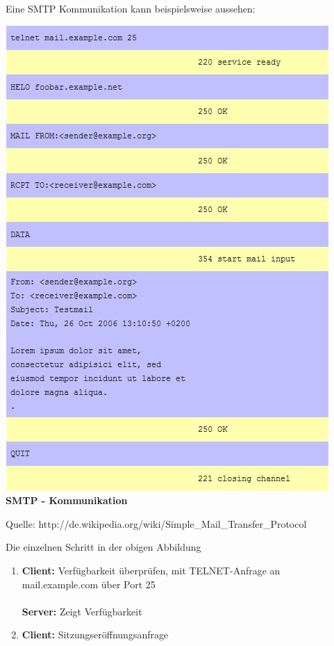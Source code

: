 \documentclass[12pt,a4paper]{report}
\begin{document}
\begin{onehalfspace}
Eine SMTP Kommunikation kann beispielsweise aussehen:
\begin{center}
\includegraphics[scale=0.9]{../docs/lyaton/graphics/SMTP-Kommunikation.png}\\
\textbf{SMTP - Kommunikation}\\
\begin{scriptsize}
Quelle: http://de.wikipedia.org/wiki/Simple\_Mail\_Transfer\_Protocol
\end{scriptsize}
\end{center}
Die einzelnen Schritt in der obigen Abbildung
\begin{enumerate}
\item \textbf{Client:} Verfügbarkeit überprüfen, mit TELNET-Anfrage an mail.example.com über Port 25\\\\
\textbf{Server:} Zeigt Verfügbarkeit
\item \textbf{Client:} Sitzungseröffnungsanfrage\\\\

\end{enumerate}
\end{onehalfspace}
\end{document}
